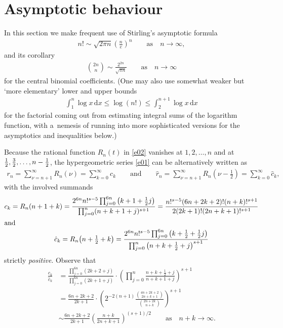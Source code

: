 \documentclass[11pt]{article}
\renewcommand{\d}{{\mathrm d}}
\begin{document}
\section{Asymptotic behaviour}\label{s3}

In this section we make frequent use of Stirling's asymptotic formula
\begin{gather*}
n!\sim\sqrt{2\pi n}\left(\frac ne\right)^n \qquad\text{as}\quad n\to\infty,
\end{gather*}
and its corollary
\begin{gather*}
\binom{2n}n\sim\frac{2^{2n}}{\sqrt{\pi n}} \qquad\text{as}\quad n\to\infty
\end{gather*}
for the central binomial coefficients. (One may also use somewhat weaker but `more elementary' lower and upper bounds
\begin{gather*}
\int_1^n\log x\,\d x\le\log(n!)\le\int_2^{n+1}\log x\,\d x
\end{gather*}
for the factorial coming out from estimating integral sums of the logarithm function, with a~nemesis of running into more sophisticated versions for the asymptotics and inequalities below.)

Because the rational function $R_n(t)$ in \eqref{e02} vanishes at $1,2,\dots,n$ and at $\frac12,\frac32,\dots,\allowbreak n-\nobreak\frac12$,
the hypergeometric series \eqref{e01} can be alternatively written as
\begin{gather*}
r_n=\sum_{\nu=n+1}^\infty R_n(\nu)=\sum_{k=0}^\infty c_k \qquad\text{and}\qquad
\hat r_n=\sum_{\nu=n+1}^\infty R_n(\nu-\tfrac12)=\sum_{k=0}^\infty\hat c_k,
\end{gather*}
with the involved summands
\begin{gather}
c_k=R_n(n+1+k)=\frac{2^{6n}n!^{s-5}\prod_{j=0}^{6n}\big(k+1+\frac12j\big)}{\prod_{j=0}^n(n+k+1+j)^{s+1}}
=\frac{n!^{s-5}(6n+2k+2)! (n+k)!^{s+1}}{2 (2k+1)! (2n+k+1)!^{s+1}}\label{e09}
\\ \intertext{and}
\hat c_k=R_n\big(n+\tfrac12+k\big)=\frac{2^{6n}n!^{s-5}\prod_{j=0}^{6n}\big(k+\frac12+\frac12j\big)} {\prod_{j=0}^n\big(n+k+\frac12+j\big)^{s+1}}\nonumber
\end{gather}
strictly \emph{positive}. Observe that
\begin{align}
\frac{c_k}{\hat c_k}
&=\frac{\prod_{j=0}^{6n}(2k+2+j)}{\prod_{j=0}^{6n}(2k+1+j)}
\cdot\left(\prod_{j=0}^n\frac{n+k+\frac12+j}{n+k+1+j}\right)^{s+1}\nonumber\\
&=\frac{6n+2k+2}{2k+1}\cdot\left(2^{-2(n+1)}\frac{\binom{4n+2k+2}{2n+k+1}}{\binom{2n+2k}{n+k}}\right)^{s+1}\nonumber\\
&\sim\frac{6n+2k+2}{2k+1}\left(\frac{n+k}{2n+k+1}\right)^{(s+1)/2} \qquad\text{as}\quad n+k\to\infty. \label{e10}
\end{align}
\end{document}
